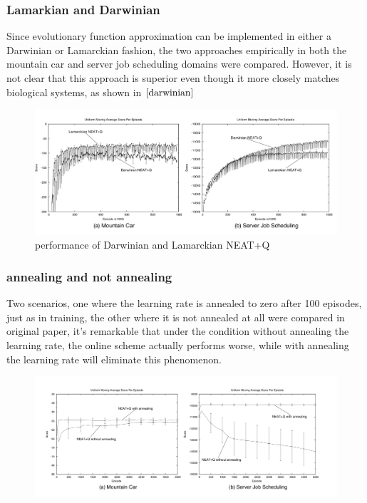 \documentclass{article}
\begin{document}
\subsubsection{Lamarkian and Darwinian}
Since evolutionary function approximation can be implemented in either a Darwinian or Lamarckian fashion, the two approaches empirically in both the mountain car and server job scheduling domains
were compared. However, it is not clear that this approach is superior even though it more closely matches biological systems, as shown in $\ref{darwinian}$
\begin{figure}[htbp]
  \includegraphics[width = \textwidth]{darwinian}
  \caption{performance of Darwinian and Lamarckian NEAT+Q}
  \label{darwinian}
 \end{figure}

\subsubsection{annealing and not annealing}
Two scenarios, one where the learning rate is annealed to zero after 100 episodes, just as in training, the other where it is not annealed at all were compared in 
original paper, it's remarkable that under the condition without annealing the learning rate, the online scheme actually performs worse, while with annealing the
learning rate will eliminate this phenomenon.
\begin{figure}[htbp]
  \includegraphics[width = \textwidth]{anneal}
  \caption{}
 \end{figure}
\end{document}
